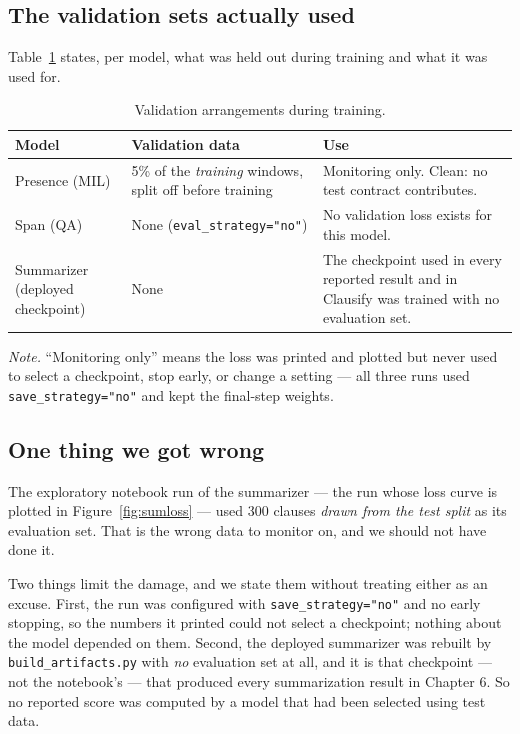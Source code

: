 \subsection{The validation sets actually used}
Table~\ref{tab:valsets} states, per model, what was held out during training and what it was used for.

\begin{table}[ht]
\centering
\caption{Validation arrangements during training.}
\label{tab:valsets}
\small
\begin{tabular}{p{2.6cm} p{4.5cm} p{6.2cm}}
\toprule
\textbf{Model} & \textbf{Validation data} & \textbf{Use}\\
\midrule
Presence (MIL) & 5\% of the \emph{training} windows, split off before training & Monitoring only. Clean: no test contract contributes.\\
\addlinespace
Span (QA) & None (\texttt{eval\_strategy="no"}) & No validation loss exists for this model.\\
\addlinespace
Summarizer (deployed checkpoint) & None & The checkpoint used in every reported result and in Clausify was trained with no evaluation set.\\
\bottomrule
\end{tabular}

{\footnotesize\singlespacing \emph{Note.} ``Monitoring only'' means the loss was printed and plotted but never used to select a checkpoint, stop early, or change a setting --- all three runs used \texttt{save\_strategy="no"} and kept the final-step weights.\par}
\end{table}

\subsection{One thing we got wrong}
The exploratory notebook run of the summarizer --- the run whose loss curve is plotted in Figure~\ref{fig:sumloss} --- used 300 clauses \emph{drawn from the test split} as its evaluation set. That is the wrong data to monitor on, and we should not have done it.

Two things limit the damage, and we state them without treating either as an excuse. First, the run was configured with \texttt{save\_strategy="no"} and no early stopping, so the numbers it printed could not select a checkpoint; nothing about the model depended on them. Second, the deployed summarizer was rebuilt by \texttt{build\_artifacts.py} with \emph{no} evaluation set at all, and it is that checkpoint --- not the notebook's --- that produced every summarization result in Chapter 6. So no reported score was computed by a model that had been selected using test data.

